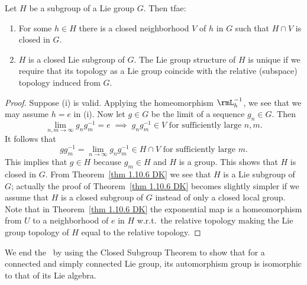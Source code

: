 \begin{cor}\label{cor 1.10.7 DK}
    Let $H$ be a subgroup of a Lie group $G$. Then \gls{tfae}:
    \begin{enumerate}[label=(\roman*)]
        \item For some $h\in H$ there is a closed neighborhood $V$ of $h$ in $G$ such that $H\cap V$ is closed in $G$.
        \item $H$ is a closed Lie subgroup of $G$. The Lie group structure of $H$ is unique if we require that its topology as a Lie group coincide with the relative (subspace) topology induced from $G$.
    \end{enumerate}
\end{cor}
\begin{proof}
    Suppose (i) is valid. Applying the homeomorphism $\rmL_h^{-1}$, we see that we may assume $h=e$ in (i). Now let $g\in G$ be the limit of a sequence $g_n\in G$. Then
    \[\lim_{n,m\to\infty} g_ng_m^{-1}=e\;\implies\; g_ng_m^{-1}\in V\text{ for sufficiently large }n,m.\]
    It follows that
    \[gg_m^{-1}=\lim_{n\to\infty} g_ng_m^{-1}\in H\cap V\text{ for sufficiently large }m.\]
    This implies that $g\in H$ because $g_m\in H$ and $H$ is a group. This shows that $H$ is closed in $G$. From Theorem~\ref{thm 1.10.6 DK} we see that $H$ is a Lie subgroup of $G$; actually the proof of Theorem~\ref{thm 1.10.6 DK} becomes slightly simpler if we assume that $H$ is a closed subgroup of $G$ instead of only a closed local group. Note that in Theorem~\ref{thm 1.10.6 DK} the exponential map is a homeomorphism from $U$ to a neighborhood of $e$ in $H$ w.r.t.\ the relative topology making the Lie group topology of $H$ equal to the relative topology.
\end{proof}

We end the \sect\ by using the Closed Subgroup Theorem to show that for a connected and simply connected Lie group, its automorphism group is isomorphic to that of its Lie algebra.

